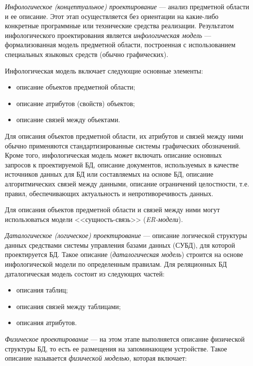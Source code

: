 \textit{Инфологическое (концептуальное) проектирование} --- анализ
предметной области и ее описание. Этот этап осуществляется без ориентации
на какие-либо конкретные программные или технические средства реализации.
Результатом инфологического проектирования является \textit{инфологическая модель} ---
формализованная модель предметной области, построенная с использованием
специальных языковых средств (обычно графических).

Инфологическая модель включает следующие основные элементы:
\begin{itemize}
\item
  описание объектов предметной области;
\item
  описание атрибутов (свойств) объектов;
\item
  описание связей между объектами.
\end{itemize}

Для описания объектов предметной области, их атрибутов и связей между
ними обычно применяются стандартизированные системы графических обозначений.
Кроме того, инфологическая модель может включать
описание основных запросов к проектируемой БД,
описание документов, используемых в качестве
источников данных для БД или составляемых на основе БД,
описание алгоритмических связей между данными,
описание ограничений целостности, т.е. правил, обеспечивающих
актуальность и непротиворечивость данных.

Для описания объектов предметной области и связей между ними
могут использоваться модели <<сущность-связь>> (\textit{ER-модели}).

\textit{Даталогическое (логическое) проектирование} --- описание
логической структуры данных средствами системы управления базами данных
(СУБД), для которой проектируется БД.
Такое описание (\textit{даталогическая модель}) строится на основе инфологической модели
по определенным правилам.
Для реляционных БД даталогическая модель состоит из следующих частей:
\begin{itemize}
\item
  описания таблиц;
\item
  описания связей между таблицами;
\item
  описания атрибутов.
\end{itemize}

\textit{Физическое проектирование} --- на этом этапе выполняется описание физической
структуры БД, то есть ее размещения на запоминающем устройстве.
Такое описание называется \textit{физической моделью}, которая включает:

